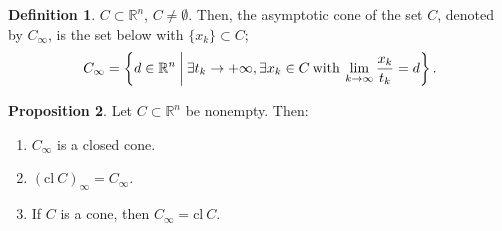 \documentclass[a4paper,11pt, oneside]{book}
\theoremstyle{definition}
\newtheorem{dfn}{Definition}[section]
\newtheorem{prop}[dfn]{Proposition}
\newcommand{\NDemenstionalRealEuclideanSpace}{\mathbb{R}^n}
\begin{document}
\begin{dfn}
  $C \subset \mathbb{R}^n$, $C \neq \emptyset$. Then, the asymptotic cone of the set $C$, denoted by $C_\infty$, is the set below with $\{ x_k \} \subset C$;
  \begin{equation}
    C_\infty = \left\{ d \in
    \mathbb{R}^n \:\middle|\: \exists t_k \rightarrow +\infty, \exists x_k \in C \:\text{\rm with}\: \lim_{k \to \infty} \frac{x_k}{t_k} = d \right\}. \notag
  \end{equation}
\end{dfn}

\begin{prop}\label{basicPropositionOfAsymptoticCone}
  Let $C \subset \NDemenstionalRealEuclideanSpace$ be nonempty. Then:
  \begin{enumerate}[label=\roman*,align=CenterWithParen]
    \item $C_{\infty}$ is a closed cone.
    \item $(\text{cl}\:C)_{\infty} = C_{\infty}$.
    \item If $C$ is a cone, then $C_{\infty} = \text{cl}\:C$.
  \end{enumerate}
\end{prop}
\end{document}

